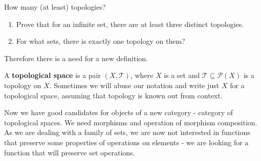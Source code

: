 \begin{exercise}
  How many (at least) topologies?
  \begin{enumerate}
    \item Prove that for an infinite set, there are at least three distinct topologies.
    \item For what sets, there is exactly one topology on them?
  \end{enumerate}
\end{exercise}



Therefore there is a need for a new definition.

\begin{definition}
  A \textbf{topological space} is a pair $(X, \mathcal T)$, where $X$ is a set and $\mathcal T\subseteq \mathcal P(X)$ is a topology on $X$. Sometimes we will abuse our notation and write just $X$ for a topological space, assuming that topology is known out from context.
\end{definition}

Now we have good candidates for objects of a new category - category of topological spaces. We need morphisms and operation of morphism composition. As we are dealing with a family of sets, we are now not interested in functions that preserve some properties of operations on elements - we are looking for a function that will preserve set operations.

